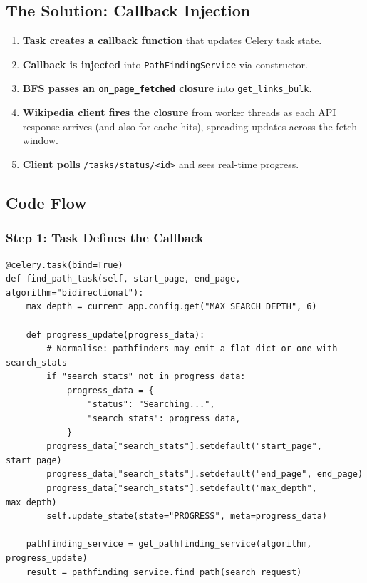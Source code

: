 \documentclass[11pt,a4paper]{article}
\begin{document}
\subsection{The Solution: Callback Injection}

\begin{enumerate}[leftmargin=*]
    \item \textbf{Task creates a callback function} that updates Celery task state.
    \item \textbf{Callback is injected} into \texttt{PathFindingService} via constructor.
    \item \textbf{BFS passes an \texttt{on\_page\_fetched} closure} into \texttt{get\_links\_bulk}.
    \item \textbf{Wikipedia client fires the closure} from worker threads as each API response arrives (and also for cache hits), spreading updates across the fetch window.
    \item \textbf{Client polls} \texttt{/tasks/status/<id>} and sees real-time progress.
\end{enumerate}

\subsection{Code Flow}

\subsubsection{Step 1: Task Defines the Callback}

\begin{lstlisting}[caption=tasks.py -- Creating the Progress Callback]
@celery.task(bind=True)
def find_path_task(self, start_page, end_page, algorithm="bidirectional"):
    max_depth = current_app.config.get("MAX_SEARCH_DEPTH", 6)

    def progress_update(progress_data):
        # Normalise: pathfinders may emit a flat dict or one with search_stats
        if "search_stats" not in progress_data:
            progress_data = {
                "status": "Searching...",
                "search_stats": progress_data,
            }
        progress_data["search_stats"].setdefault("start_page", start_page)
        progress_data["search_stats"].setdefault("end_page", end_page)
        progress_data["search_stats"].setdefault("max_depth", max_depth)
        self.update_state(state="PROGRESS", meta=progress_data)

    pathfinding_service = get_pathfinding_service(algorithm, progress_update)
    result = pathfinding_service.find_path(search_request)
\end{lstlisting}
\end{document}
